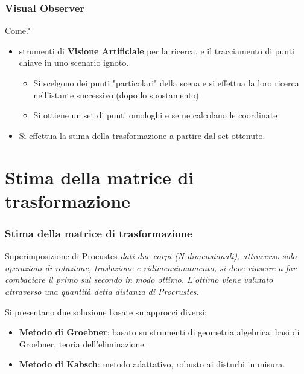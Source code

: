 \documentclass{beamer}
\begin{document}
\begin{frame}
\frametitle{Visual Observer}
\begin{block}{Come?}
	\begin{itemize}	
		\item strumenti di \textbf{Visione Artificiale} per la ricerca, e il tracciamento di punti chiave in uno scenario ignoto.
			\begin{itemize}
				\item Si scelgono dei punti "particolari" della scena e si effettua la loro ricerca nell'istante successivo (dopo lo spostamento)
				\item Si ottiene un set di punti omologhi e se ne calcolano le coordinate  
			\end{itemize}
		\item Si effettua la stima della trasformazione a partire dal set ottenuto.
	\end{itemize} 
\end{block}
\end{frame}

\section{Stima della matrice di trasformazione}

\begin{frame}
\frametitle{Stima della matrice di trasformazione}
\begin{block}{Superimposizione di Procustes}
\textit{dati due corpi (N-dimensionali), attraverso solo operazioni di rotazione, traslazione e ridimensionamento, si deve riuscire a far combaciare il primo sul secondo in modo ottimo. L'ottimo viene valutato attraverso una quantità detta distanza di Procrustes.}
\end{block}
Si presentano due soluzione basate su approcci diversi:
\begin{itemize}
	\item \textbf{Metodo di Groebner}: basato su strumenti di geometria algebrica: basi di Groebner, teoria dell'eliminazione.
	\item \textbf{Metodo di Kabsch}: metodo adattativo, robusto ai disturbi in misura.
\end{itemize}
\end{frame}
\end{document}
